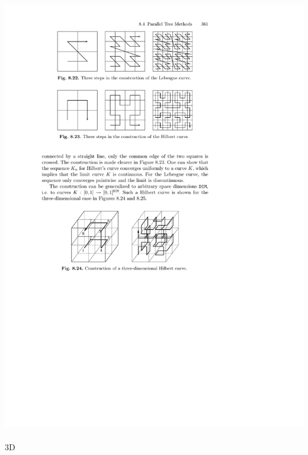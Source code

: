 \documentclass[mathserif]{beamer}
\begin{document}
\begin{frame}
\begin{minipage}[b]{0.40\linewidth}
	\includegraphics[viewport = 105 590 375 680, scale=0.6, clip]{figures/hilbertCurve.pdf}
	\ \\
	3D

\end{minipage}
\end{frame}
\end{document}
